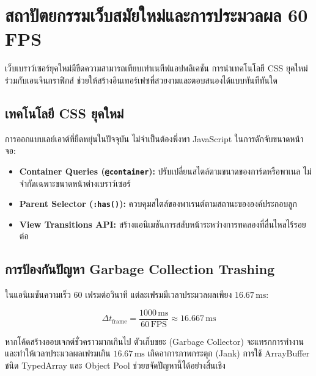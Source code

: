 \chapter{สถาปัตยกรรมเว็บสมัยใหม่และการประมวลผล 60 FPS}

เว็บเบราว์เซอร์ยุคใหม่มีขีดความสามารถเทียบเท่าเนทีฟแอปพลิเคชัน การนำเทคโนโลยี CSS ยุคใหม่ร่วมกับเอนจินกราฟิกส์ ช่วยให้สร้างอินเทอร์เฟซที่สวยงามและตอบสนองได้แบบทันทีทันใด

\section{เทคโนโลยี CSS ยุคใหม่}

การออกแบบเลย์เอาต์ที่ยืดหยุ่นในปัจจุบัน ไม่จำเป็นต้องพึ่งพา JavaScript ในการดักจับขนาดหน้าจอ:
\begin{itemize}
    \item \textbf{Container Queries (\texttt{@container}):} ปรับเปลี่ยนสไตล์ตามขนาดของการ์ดหรือพาเนล ไม่จำกัดเฉพาะขนาดหน้าต่างเบราว์เซอร์
    \item \textbf{Parent Selector (\texttt{:has()}):} ควบคุมสไตล์ของพาเรนต์ตามสถานะขององค์ประกอบลูก
    \item \textbf{View Transitions API:} สร้างแอนิเมชันการสลับหน้าระหว่างการทดลองที่ลื่นไหลไร้รอยต่อ
\end{itemize}

\section{การป้องกันปัญหา Garbage Collection Trashing}

ในแอนิเมชันความเร็ว 60 เฟรมต่อวินาที แต่ละเฟรมมีเวลาประมวลผลเพียง $16.67\,\text{ms}$:

\begin{equation}
\Delta t_{\text{frame}} = \frac{1000\,\text{ms}}{60\,\text{FPS}} \approx 16.667\,\text{ms}
\end{equation}

หากโค้ดสร้างออบเจกต์ชั่วคราวมากเกินไป ตัวเก็บขยะ (Garbage Collector) จะแทรกการทำงานและทำให้เวลาประมวลผลเฟรมเกิน $16.67\,\text{ms}$ เกิดอาการภาพกระตุก (Jank) การใช้ ArrayBuffer ชนิด TypedArray และ Object Pool ช่วยขจัดปัญหานี้ได้อย่างสิ้นเชิง
